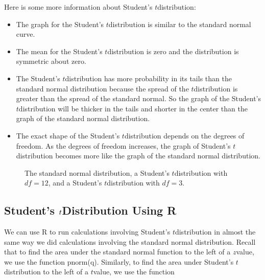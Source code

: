 \documentclass[letterpaper,10pt,english]{jupyterBook}
\begin{document}
\sphinxAtStartPar
Here is some more information about Student’s \(t\)\sphinxhyphen{}distribution:
\begin{itemize}
\item {} 
\sphinxAtStartPar
The graph for the Student’s \(t\)\sphinxhyphen{}distribution is similar to the standard normal curve.

\item {} 
\sphinxAtStartPar
The mean for the Student’s \(t\)\sphinxhyphen{}distribution is zero and the distribution is symmetric about zero.

\item {} 
\sphinxAtStartPar
The Student’s \(t\)\sphinxhyphen{}distribution has more probability in its tails than the standard normal distribution because the spread of the \(t\)\sphinxhyphen{}distribution is greater than the spread of the standard normal. So the graph of the Student’s \(t\)\sphinxhyphen{}distribution will be thicker in the tails and shorter in the center than the graph of the standard normal distribution.

\item {} 
\sphinxAtStartPar
The exact shape of the Student’s \(t\)\sphinxhyphen{}distribution depends on the degrees of freedom. As the degrees of freedom increases, the graph of Student’s \(t\)\sphinxhyphen{}distribution becomes more like the graph of the standard normal distribution.

\end{itemize}

\begin{figure}[htbp]
\centering
\capstart

\noindent{}
\caption{The standard normal distribution, a Student’s \(t\)\sphinxhyphen{}distribution with \(df = 12\), and a Student’s \(t\)\sphinxhyphen{}distribution with \(df = 3\).}\label{\detokenize{Ch5 Confidence Intervals/5.3 Student's t-Distribution:t-dists}}\end{figure}


\subsection{Student’s \protect\(t\protect\)\sphinxhyphen{}Distribution Using R}
\label{\detokenize{Ch5 Confidence Intervals/5.3 Student's t-Distribution:student-s-t-distribution-using-r}}
\sphinxAtStartPar
We can use R to run calculations involving Student’s \(t\)\sphinxhyphen{}distribution in almost the same way we did calculations involving the standard normal distribution. Recall that to find the area under the standard normal function to the left of a \(z\)\sphinxhyphen{}value, we use the function pnorm(q). Similarly, to find the area under Student’s \(t\)\sphinxhyphen{}distribution to the left of a \(t\)\sphinxhyphen{}value, we use the function
\end{document}
